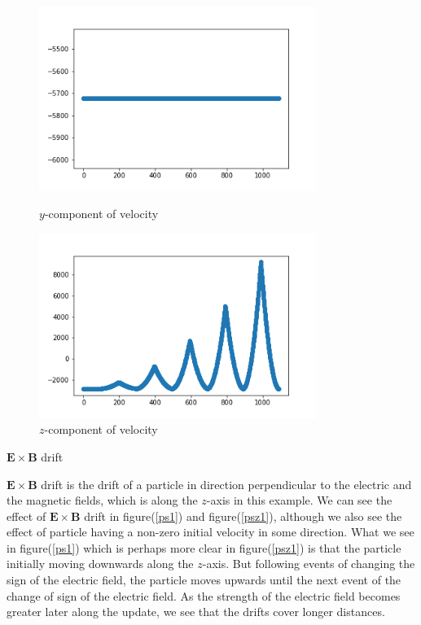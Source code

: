 \documentclass[12pt]{article}
\begin{document}
\begin{figure}[H]
	\begin{multicols}{2}
		\includegraphics[width=\linewidth, height=6cm]{vsy1.png} \caption{$y$-component of velocity} \label{vsy1} \par
		\includegraphics[width=\linewidth, height=6cm]{vsz1.png} \caption{$z$-component of velocity} \label{vsz1} \par
	\end{multicols}
\end{figure}	

\begin{tcolorbox}[width=3cm]
	$\mathbf{E} \times \mathbf{B}$ drift
\end{tcolorbox}
	$\mathbf{E} \times \mathbf{B}$ drift is the drift of a particle in direction perpendicular to the electric and the magnetic fields, which is along the $z$-axis in this example. We can see the effect of $\mathbf{E} \times \mathbf{B}$ drift in figure(\ref{ps1}) and figure(\ref{psz1}), although we also see the effect of particle having a non-zero initial velocity in some direction. What we see in figure(\ref{ps1}) which is perhaps more clear in figure(\ref{psz1}) is that the particle initially moving downwards along the $z$-axis. But following events of changing the sign of the electric field, the particle moves upwards until the next event of the change of sign of the electric field. As the strength of the electric field becomes greater later along the update, we see that the drifts cover longer distances.
	
\end{document}
